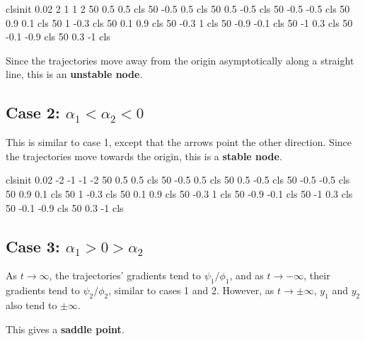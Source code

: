 \begin{center}
\phaseportrait
{      clsinit 0.02 2 1 1 2
      50 0.5 0.5 cls    50 -0.5 0.5 cls    50 0.5 -0.5 cls    50 -0.5 -0.5 cls 
      50 0.9 0.1 cls	50 1 -0.3 cls	   50 0.1 0.9 cls     50 -0.3 1 cls
      50 -0.9 -0.1 cls	50 -1 0.3 cls	   50 -0.1 -0.9 cls   50 0.3 -1 cls
}
{}
\end{center}

Since the trajectories move away from the origin asymptotically along a
straight line, this is an \textbf{unstable node}.


\subsection{Case 2: $\alpha_1<\alpha_2<0$}

This is similar to case 1, except that the arrows point the other direction.
Since the trajectories move towards the origin, this is a \textbf{stable node}.

\begin{center}
\phaseportrait
{clsinit 0.02 -2 -1 -1 -2
      50 0.5 0.5 cls    50 -0.5 0.5 cls    50 0.5 -0.5 cls    50 -0.5 -0.5 cls 
      50 0.9 0.1 cls	50 1 -0.3 cls	   50 0.1 0.9 cls     50 -0.3 1 cls
      50 -0.9 -0.1 cls	50 -1 0.3 cls	   50 -0.1 -0.9 cls   50 0.3 -1 cls
}
{}
\end{center}

\subsection{Case 3: $\alpha_1>0>\alpha_2$}

As $t\to\infty$, the trajectories' gradients tend to $\psi_1/\phi_1$, and as
$t\to-\infty$, their gradients tend to $\psi_2/\phi_2$, similar to cases 1
and 2.  However, as $t\to\pm\infty$, $y_1$ and $y_2$ also tend to
$\pm\infty$.  

This gives a \textbf{saddle point}.

\begin{center}
\end{center}

